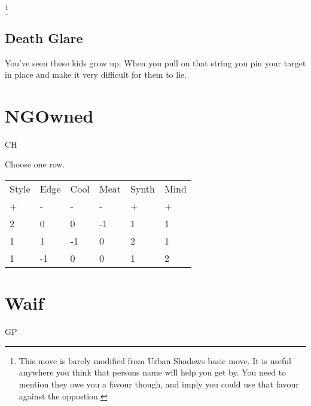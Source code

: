 \documentclass{tufte-book}
\begin{document}
\footnote{This move is barely modified from Urban Shadows basic move. It is useful anywhere you think that persons name will help you get by. You need to mention they owe you a favour though, and imply you could use that favour against the oppostion.}

\subsection{Death Glare}
You've seen these kids grow up. When you pull on that string you pin your target in place and make it very difficult for them to lie.




\section{NGOwned} \label{sec:NGOwned}
CH


Choose one row.
\begin{table}[ht]
\centering
{}\selectfont
\begin{tabular}{llllll}
\toprule
Style & Edge & Cool & Meat & Synth & Mind\\
+&-&-&-&+&+\\
\midrule
2&0&0&-1&1&1\\
1&1&-1&0&2&1\\
1&-1&0&0&1&2\\
\bottomrule
\end{tabular}
\end{table}



\section{Waif} \label{sec:Waif}
GP
\end{document}
